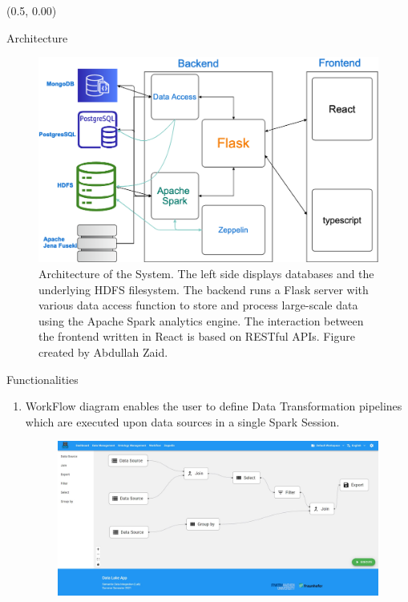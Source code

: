 \documentclass[12pt]{beamer}
\begin{document}
\begin{textblock}{0.5}(0.5, 0.00)


\begin{block}{Architecture}
\begin{figure}[H]
\includegraphics[width=0.8\linewidth,height=0.20\textheight]{data.png}
\caption{Architecture of the System. The left side displays databases and the underlying HDFS filesystem. The backend runs a Flask server with various data access function to store and process large-scale data using the Apache Spark analytics engine. The interaction between the frontend written in React is based on RESTful APIs. Figure created by Abdullah Zaid.} \label{Figure 1}
\end{figure} 
\end{block}




\begin{block}{Functionalities}
\begin{enumerate}
\item WorkFlow diagram enables the user to define Data Transformation pipelines which are executed upon data sources in a single Spark Session.
\begin{figure}[H]
\includegraphics[width=1\linewidth]{datamart.JPG} 
\label{WorkFlow}
\end{figure}   
 

\end{enumerate}
\end{block}
\end{textblock}
\end{document}
